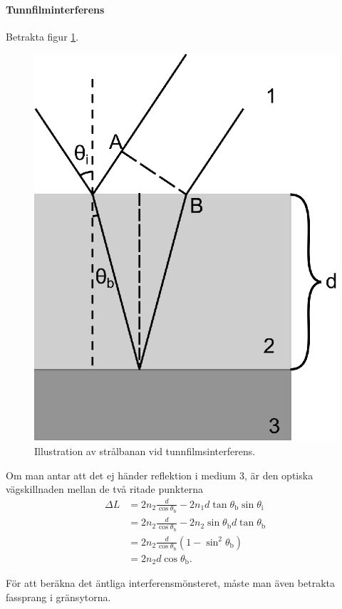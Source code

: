 \paragraph{Tunnfilminterferens}
Betrakta figur \ref{fig:thin-film}.
\begin{figure}[!ht]
	\centering
	\includegraphics[scale=1]{./Images/thin-film/thin-film.eps}
	\caption{Illustration av strålbanan vid tunnfilmsinterferens.}
	\label{fig:thin-film}
\end{figure}

Om man antar att det ej händer reflektion i medium 3, är den optiska vägskillnaden mellan de två ritade punkterna
\begin{align*}
	\Delta L &= 2n_2\frac{d}{\cos{\theta_{\text{b}}}} - 2n_1d\tan{\theta_{\text{b}}}\sin{\theta_{\text{i}}} \\
	         &= 2n_2\frac{d}{\cos{\theta_{\text{b}}}} - 2n_2\sin{\theta_{\text{b}}}d\tan{\theta_{\text{b}}} \\
	         &= 2n_2\frac{d}{\cos{\theta_{\text{b}}}}\left(1 -\sin^2{\theta_{\text{b}}}\right) \\
	         &= 2n_2d\cos{\theta_{\text{b}}}.
\end{align*}

För att beräkna det äntliga interferensmönsteret, måste man även betrakta fassprang i gränsytorna.